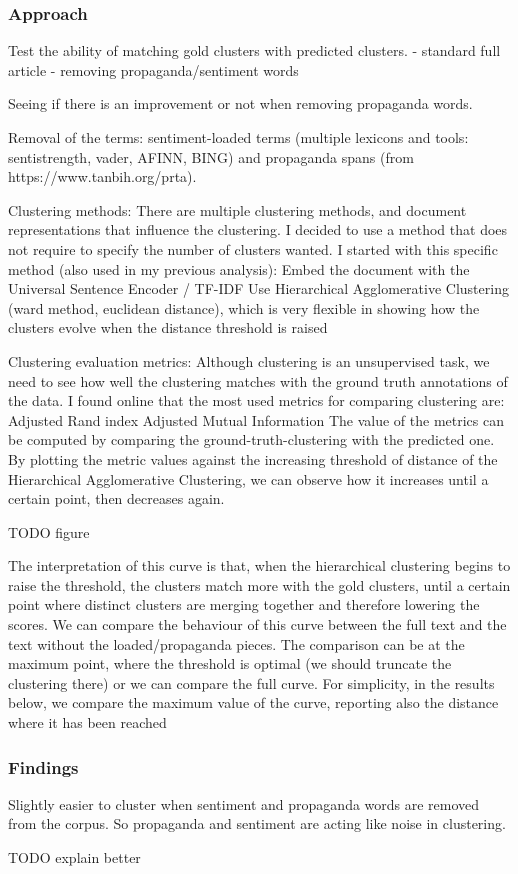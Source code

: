 \subsubsection{Approach}

Test the ability of matching gold clusters with predicted clusters.
- standard full article
- removing propaganda/sentiment words

Seeing if there is an improvement or not when removing propaganda words.

Removal of the terms: sentiment-loaded terms (multiple lexicons and tools: sentistrength, vader, AFINN, BING) and propaganda spans (from https://www.tanbih.org/prta).

Clustering methods:
There are multiple clustering methods, and document representations that influence the clustering. I decided to use a method that does not require to specify the number of clusters wanted.
I started with this specific method (also used in my previous analysis):
Embed the document with the Universal Sentence Encoder / TF-IDF
Use Hierarchical Agglomerative Clustering (ward method, euclidean distance), which  is very flexible in showing how the clusters evolve when the distance threshold is raised


Clustering evaluation metrics:
Although clustering is an unsupervised task, we need to see how well the clustering matches with the ground truth annotations of the data. I found online that the most used metrics for comparing clustering are:
Adjusted Rand index
Adjusted Mutual Information
The value of the metrics can be computed by comparing the ground-truth-clustering with the predicted one.
By plotting the metric values against the increasing threshold of distance of the Hierarchical Agglomerative Clustering, we can observe how it increases until a certain point, then decreases again.

TODO figure

The interpretation of this curve is that, when the hierarchical clustering begins to raise the threshold, the clusters match more with the gold clusters, until a certain point where distinct clusters are merging together and therefore lowering the scores.
We can compare the behaviour of this curve between the full text and the text without the loaded/propaganda pieces. The comparison can be at the maximum point, where the threshold is optimal (we should truncate the clustering there) or we can compare the full curve. For simplicity, in the results below, we compare the maximum value of the curve, reporting also the distance where it has been reached


\subsubsection{Findings}

Slightly easier to cluster when sentiment and propaganda words are removed from the corpus.
So propaganda and sentiment are acting like noise in clustering.

TODO explain better

